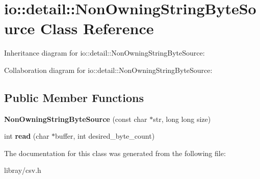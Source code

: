 \hypertarget{classio_1_1detail_1_1NonOwningStringByteSource}{}\section{io\+:\+:detail\+:\+:Non\+Owning\+String\+Byte\+Source Class Reference}
\label{classio_1_1detail_1_1NonOwningStringByteSource}


Inheritance diagram for io\+:\+:detail\+:\+:Non\+Owning\+String\+Byte\+Source\+:


Collaboration diagram for io\+:\+:detail\+:\+:Non\+Owning\+String\+Byte\+Source\+:
\subsection*{Public Member Functions}
\begin{DoxyCompactItemize}
\item 
\mbox{\label{classio_1_1detail_1_1NonOwningStringByteSource_a8fd604017b38e20f90386b6e10bd95a3}} 
{\bfseries Non\+Owning\+String\+Byte\+Source} (const char $\ast$str, long long size)
\item 
\mbox{\label{classio_1_1detail_1_1NonOwningStringByteSource_aba194be7e3a141f40d683db483a620bb}} 
int {\bfseries read} (char $\ast$buffer, int desired\+\_\+byte\+\_\+count)
\end{DoxyCompactItemize}


The documentation for this class was generated from the following file\+:\begin{DoxyCompactItemize}
\item 
libray/csv.\+h\end{DoxyCompactItemize}
